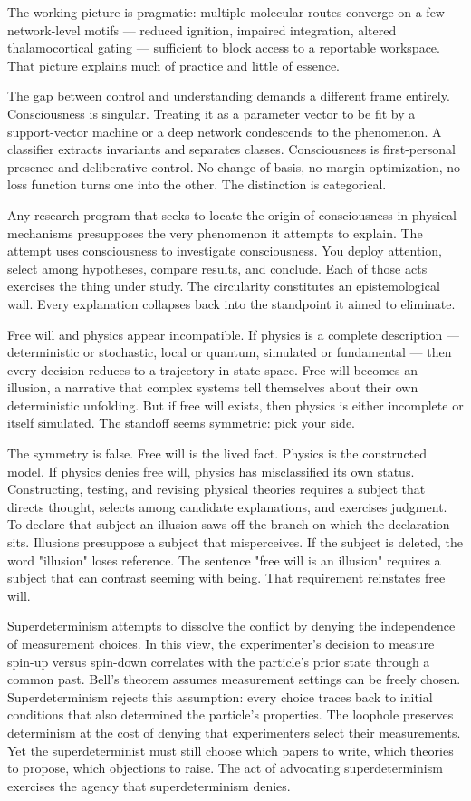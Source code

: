 The working picture is pragmatic: multiple molecular routes converge on a few network-level motifs — reduced ignition, impaired integration, altered thalamocortical gating — sufficient to block access to a reportable workspace. That picture explains much of practice and little of essence.

The gap between control and understanding demands a different frame entirely. Consciousness is singular. Treating it as a parameter vector to be fit by a support-vector machine or a deep network condescends to the phenomenon. A classifier extracts invariants and separates classes. Consciousness is first-personal presence and deliberative control. No change of basis, no margin optimization, no loss function turns one into the other. The distinction is categorical.

Any research program that seeks to locate the origin of consciousness in physical mechanisms presupposes the very phenomenon it attempts to explain. The attempt uses consciousness to investigate consciousness. You deploy attention, select among hypotheses, compare results, and conclude. Each of those acts exercises the thing under study. The circularity constitutes an epistemological wall. Every explanation collapses back into the standpoint it aimed to eliminate.

Free will and physics appear incompatible. If physics is a complete description — deterministic or stochastic, local or quantum, simulated or fundamental — then every decision reduces to a trajectory in state space. Free will becomes an illusion, a narrative that complex systems tell themselves about their own deterministic unfolding. But if free will exists, then physics is either incomplete or itself simulated. The standoff seems symmetric: pick your side.

The symmetry is false. Free will is the lived fact. Physics is the constructed model. If physics denies free will, physics has misclassified its own status. Constructing, testing, and revising physical theories requires a subject that directs thought, selects among candidate explanations, and exercises judgment. To declare that subject an illusion saws off the branch on which the declaration sits. Illusions presuppose a subject that misperceives. If the subject is deleted, the word "illusion" loses reference. The sentence "free will is an illusion" requires a subject that can contrast seeming with being. That requirement reinstates free will.

Superdeterminism attempts to dissolve the conflict by denying the independence of measurement choices. In this view, the experimenter's decision to measure spin-up versus spin-down correlates with the particle's prior state through a common past. Bell's theorem assumes measurement settings can be freely chosen. Superdeterminism rejects this assumption: every choice traces back to initial conditions that also determined the particle's properties. The loophole preserves determinism at the cost of denying that experimenters select their measurements. Yet the superdeterminist must still choose which papers to write, which theories to propose, which objections to raise. The act of advocating superdeterminism exercises the agency that superdeterminism denies.

